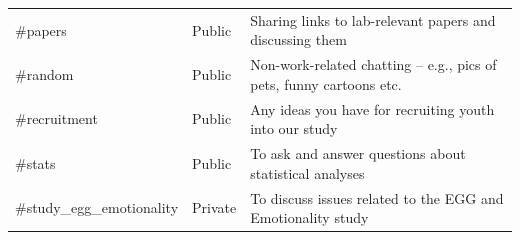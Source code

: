\documentclass[]{book}
\begin{document}
\begin{longtable}[]{@{}lll@{}}
\begin{minipage}[t]{0.18\columnwidth}
\#papers\strut
\end{minipage} & \begin{minipage}[t]{0.04\columnwidth}\raggedright
Public\strut
\end{minipage} & \begin{minipage}[t]{0.70\columnwidth}\raggedright
Sharing links to lab-relevant papers and discussing them\strut
\end{minipage}\tabularnewline
\begin{minipage}[t]{0.18\columnwidth}\raggedright
\#random\strut
\end{minipage} & \begin{minipage}[t]{0.04\columnwidth}\raggedright
Public\strut
\end{minipage} & \begin{minipage}[t]{0.70\columnwidth}\raggedright
Non-work-related chatting -- e.g., pics of pets, funny cartoons etc.\strut
\end{minipage}\tabularnewline
\begin{minipage}[t]{0.18\columnwidth}\raggedright
\#recruitment\strut
\end{minipage} & \begin{minipage}[t]{0.04\columnwidth}\raggedright
Public\strut
\end{minipage} & \begin{minipage}[t]{0.70\columnwidth}\raggedright
Any ideas you have for recruiting youth into our study\strut
\end{minipage}\tabularnewline
\begin{minipage}[t]{0.18\columnwidth}\raggedright
\#stats\strut
\end{minipage} & \begin{minipage}[t]{0.04\columnwidth}\raggedright
Public\strut
\end{minipage} & \begin{minipage}[t]{0.70\columnwidth}\raggedright
To ask and answer questions about statistical analyses\strut
\end{minipage}\tabularnewline
\begin{minipage}[t]{0.18\columnwidth}\raggedright
\#study\_egg\_emotionality\strut
\end{minipage} & \begin{minipage}[t]{0.04\columnwidth}\raggedright
Private\strut
\end{minipage} & \begin{minipage}[t]{0.70\columnwidth}\raggedright
To discuss issues related to the EGG and Emotionality study\strut
\end{minipage}\tabularnewline

\end{longtable}
\end{document}
